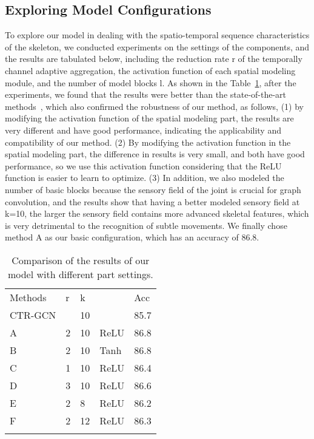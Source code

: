 \documentclass[letterpaper]{article} \usepackage[submission]{aaai23}  \usepackage{times}  \usepackage{helvet}  \usepackage{courier}  \usepackage[hyphens]{url}  \usepackage{graphicx} \urlstyle{rm} \def\UrlFont{\rm}  \usepackage{natbib}  \usepackage{caption} \frenchspacing  \setlength{\pdfpagewidth}{8.5in} \setlength{\pdfpageheight}{11in} \usepackage{algorithm}
\begin{document}
\subsection{Exploring Model Configurations}
To explore our model in dealing with the spatio-temporal sequence characteristics of the skeleton, we conducted experiments on the settings of the components, and the results are tabulated below, including the reduction rate r of the temporally channel adaptive aggregation, the activation function of each spatial modeling module, and the number of model blocks l. As shown in the Table~\ref{133}, after the experiments, we found that the results were better than the state-of-the-art methods~\cite{2021Channel}, which also confirmed the robustness of our method, as follows, (1) by modifying the activation function of the spatial modeling part, the results are very different and have good performance, indicating the applicability and compatibility of our method. (2) By modifying the activation function in the spatial modeling part, the difference in results is very small, and both have good performance, so we use this activation function considering that the ReLU function is easier to learn to optimize. (3) In addition, we also modeled the number of basic blocks because the sensory field of the joint is crucial for graph convolution, and the results show that having a better modeled sensory field at k=10, the larger the sensory field contains more advanced skeletal features, which is very detrimental to the recognition of subtle movements. We finally chose method A as our basic configuration, which has an accuracy of 86.8.




\begin{table}[htp]
 \centering
\begin{tabular}{lllll}
\hline\noalign{\smallskip}
Methods & r &k &  & Acc\\
\noalign{\smallskip}\hline\noalign{\smallskip}
CTR-GCN&&10&&85.7\\
A& 2&10&ReLU&86.8\\
B& 2&10&Tanh&86.8\\
C& 1&10&ReLU&86.4\\
D& 3&10&ReLU&86.6\\
E& 2&8&ReLU&86.2\\
F& 2&12&ReLU&86.3\\
\noalign{\smallskip}\hline
\end{tabular}
\caption{Comparison of the results of our model with different part settings.}
\label{133}
\end{table}
\end{document}
